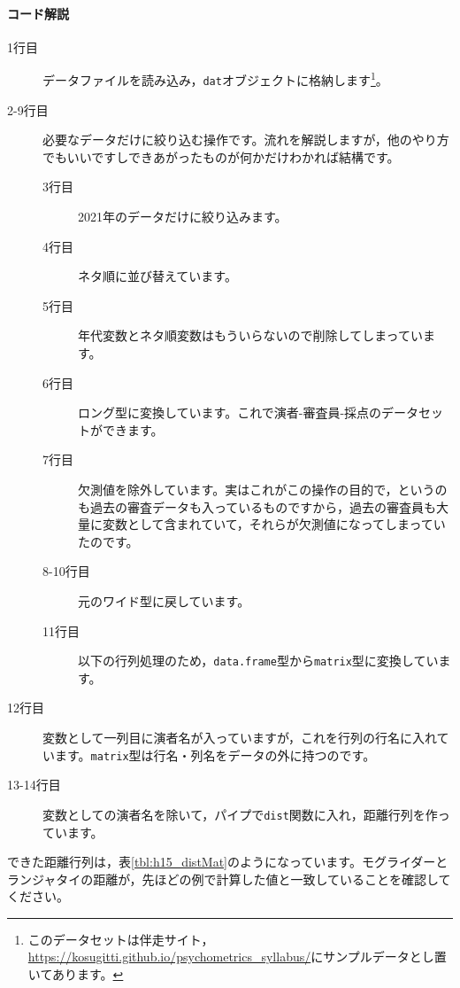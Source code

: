 \documentclass{ltjsbook}
\begin{document}
\paragraph{コード解説}
\begin{description}
	\item[1行目] データファイルを読み込み，\verb|dat|オブジェクトに格納します\footnote{このデータセットは伴走サイト，\url{https://kosugitti.github.io/psychometrics_syllabus/}にサンプルデータとし置いてあります。}。
	\item[2-9行目] 必要なデータだけに絞り込む操作です。流れを解説しますが，他のやり方でもいいですしできあがったものが何かだけわかれば結構です。
	      \begin{description}
		      \item[3行目] 2021年のデータだけに絞り込みます。
		      \item[4行目] ネタ順に並び替えています。
		      \item[5行目] 年代変数とネタ順変数はもういらないので削除してしまっています。
		      \item[6行目] ロング型に変換しています。これで演者-審査員-採点のデータセットができます。
		      \item[7行目] 欠測値を除外しています。実はこれがこの操作の目的で，というのも過去の審査データも入っているものですから，過去の審査員も大量に変数として含まれていて，それらが欠測値になってしまっていたのです。
		      \item[8-10行目] 元のワイド型に戻しています。
		      \item[11行目] 以下の行列処理のため，\verb|data.frame|型から\verb|matrix|型に変換しています。
	      \end{description}
	\item[12行目] 変数として一列目に演者名が入っていますが，これを行列の行名に入れています。\verb|matrix|型は行名・列名をデータの外に持つのです。
	\item[13-14行目] 変数としての演者名を除いて，パイプで\verb|dist|関数に入れ，距離行列を作っています。
\end{description}
できた距離行列は，表\ref{tbl:h15_distMat}のようになっています。モグライダーとランジャタイの距離が，先ほどの例で計算した値と一致していることを確認してください。
\end{document}

